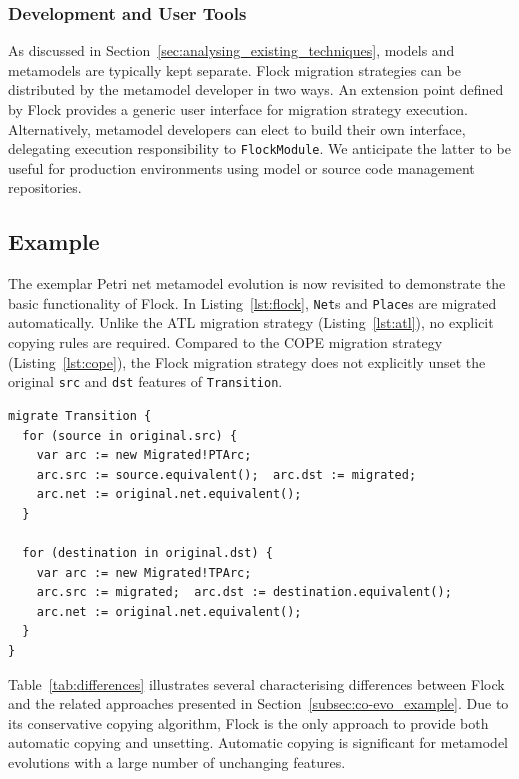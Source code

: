 \subsubsection{Development and User Tools}
As discussed in Section~\ref{sec:analysing_existing_techniques}, models and metamodels are typically kept separate. Flock migration strategies can be distributed by the metamodel developer in two ways. An extension point defined by Flock provides a generic user interface for migration strategy execution. Alternatively, metamodel developers can elect to build their own interface, delegating execution responsibility to \texttt{FlockModule}. We anticipate the latter to be useful for production environments using model or source code management repositories.


\subsection{Example}
The exemplar Petri net metamodel evolution is now revisited to demonstrate the basic functionality of Flock. In Listing~\ref{lst:flock}, \texttt{Net}s and \texttt{Place}s are migrated automatically. Unlike the ATL migration strategy (Listing~\ref{lst:atl}), no explicit copying rules are required. Compared to the COPE migration strategy (Listing~\ref{lst:cope}), the Flock migration strategy does not explicitly unset the original \texttt{src} and \texttt{dst} features of \texttt{Transition}.

\begin{lstlisting}[caption=Petri nets model migration in Flock, label=lst:flock, language=Flock]
migrate Transition {
  for (source in original.src) {
    var arc := new Migrated!PTArc;
    arc.src := source.equivalent();  arc.dst := migrated;
    arc.net := original.net.equivalent();
  }

  for (destination in original.dst) {
    var arc := new Migrated!TPArc;
    arc.src := migrated;  arc.dst := destination.equivalent();
    arc.net := original.net.equivalent();
  }
}
\end{lstlisting}

Table~\ref{tab:differences} illustrates several characterising differences between Flock and the related approaches presented in Section~\ref{subsec:co-evo_example}. Due to its conservative copying algorithm, Flock is the only approach to provide both automatic copying and unsetting. Automatic copying is significant for metamodel evolutions with a large number of unchanging features.

